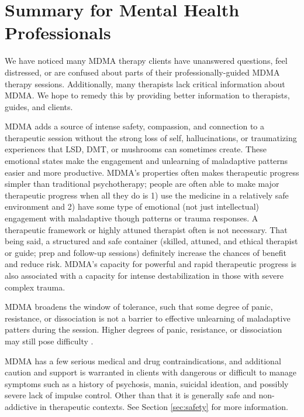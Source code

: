 \documentclass[12pt,letterpaper]{book}
\begin{document}
\section{Summary for Mental Health Professionals}
We have noticed many MDMA therapy clients have unanswered questions, feel distressed, or are confused about parts of their professionally-guided MDMA therapy sessions. Additionally, many therapists lack critical information about MDMA. We hope to remedy this by providing better information to therapists, guides, and clients.

MDMA adds a source of intense safety, compassion, and connection to a therapeutic session without the strong loss of self, hallucinations, or traumatizing experiences that LSD, DMT, or mushrooms can sometimes create. These emotional states make the engagement and unlearning of maladaptive patterns easier and more productive. MDMA's properties often makes therapeutic progress simpler than traditional psychotherapy; people are often able to make major therapeutic progress when all they do is 1) use the medicine in a relatively safe environment and 2) have some type of emotional (not just intellectual) engagement with maladaptive though patterns or trauma responses. A therapeutic framework or highly attuned therapist often is not necessary. That being said, a structured and safe container (skilled, attuned, and ethical therapist or guide; prep and follow-up sessions) definitely increase the chances of benefit and reduce risk. MDMA's capacity for powerful and rapid therapeutic progress is also associated with a capacity for intense destabilization in those with severe complex trauma.

MDMA broadens the window of tolerance, such that some degree of panic, resistance, or dissociation is not a barrier to effective unlearning of maladaptive patters during the session. Higher degrees of panic, resistance, or dissociation may still pose difficulty \cite{razviPresentation}.

MDMA has a few serious medical and drug contraindications, and additional caution and support is warranted in clients with dangerous or difficult to manage symptoms such as a history of psychosis, mania, suicidal ideation, and possibly severe lack of impulse control. Other than that it is generally safe and non-addictive in therapeutic contexts. See Section \ref{sec:safety} for more information.
\end{document}
